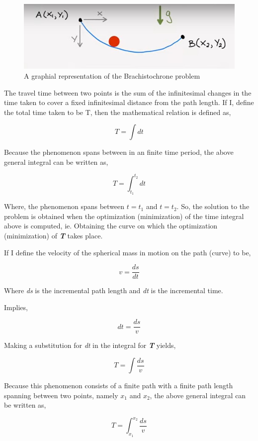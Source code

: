 

\begin{figure}[H]
\centering
\includegraphics[width=15cm]{BrachPoints.jpg}
    		\caption{{A graphial representation of the Brachistochrone problem}}
\end{figure}


{The travel time between two points is the sum of the infinitesimal changes in the time taken to cover a fixed infinitesimal distance from the path length. If I, define the total time taken to be T, then the mathematical relation is defined as,}

	$$T = \int dt$$

{Because the phenomenon spans between in an finite time period, the above general integral can be written as,}

	$$T = \int_{t_{1}}^{t_{2}} dt$$

{Where, the phenomenon spans between $t = t_{1}$ and $t = t_{2}$. So, the solution to the problem is obtained when the optimization (minimization) of the time integral above is computed, ie. Obtaining the curve on which the optimization (minimization) of \textit{\textbf{T}} takes place.}

{If I define the velocity of the spherical mass in motion on the path (curve) to be,}

	$$v = \frac{ds}{dt}$$

{Where \textit{ds} is the incremental path length and \textit{dt} is the incremental time.}

{Implies,}

	$$dt = \frac{ds}{v}$$

{Making a substitution for \textit{dt} in the integral for \textit{\textbf{T}} yields,}

	$$T = \int \frac{ds}{v}$$

{Because this phenomenon consists of a finite path with a finite path length spanning between two points, namely $x_{1}$ and $x_{2}$, the above general integral can be written as,}

	\begin{equation}
		T = \int_{x_{1}}^{x_{2}} \frac{ds}{v}
		\label{T-ab}
	\end{equation}

